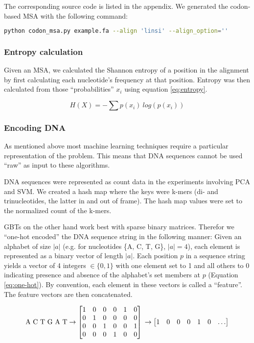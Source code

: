 The corresponding source code is listed in the appendix. We generated the codon-based MSA with the following command:


\begin{lstlisting}[language=bash]
python codon_msa.py example.fa --align 'linsi' --align_option=''
\end{lstlisting}


\subsubsection{Entropy calculation}

Given an MSA, we calculated the Shannon entropy of a position in the alignment by first calculating each nucleotide's frequency at that position. Entropy was then calculated from those ``probabilities'' $x_i$ using equation \ref{eq:entropy}.


\begin{equation}
H(X) = -\sum{p(x_i)\ log(p(x_i))}
\label{eq:entropy}
\end{equation}


\subsubsection{Encoding DNA}

As mentioned above most machine learning techniques require a particular representation of the problem. This means that DNA sequences cannot be used ``raw'' as input to these algorithms.

DNA sequences were represented as count data in the experiments involving PCA and SVM. We created a hash map where the keys were k-mers (di- and trinucleotides, the latter in and out of frame). The hash map values were set to the normalized count of the k-mers.

GBTs on the other hand work best with sparse binary matrices. Therefor we ``one-hot encoded'' the DNA sequence string in the following manner: Given an alphabet of size $|a|$ (e.g. for nucleotides \{A, C, T, G\}, $|a| = 4$), each element is represented as a binary vector of length $|a|$. Each position $p$ in a sequence string yields a vector of 4 integers $\in \{0, 1\}$ with one element set to 1 and all others to 0 indicating presence and absence of the alphabet's set members at $p$ (Equation \ref{eq:one-hot}). By convention, each element in these vectors is called a ``feature''. The feature vectors are then concatenated.


\begin{equation}
\textrm{A\ C\ T\ G\ A\ T}
\rightarrow
\begin{bmatrix}1&0&0&0&1&0\\0&1&0&0&0&0\\0&0&1&0&0&1\\0&0&0&1&0&0\end{bmatrix}\\
\rightarrow
\begin{bmatrix}1 & 0 & 0 & 0 & 1 & 0 & \dots \end{bmatrix}
\label{eq:one-hot}
\end{equation}
\vspace{0.5cm}


